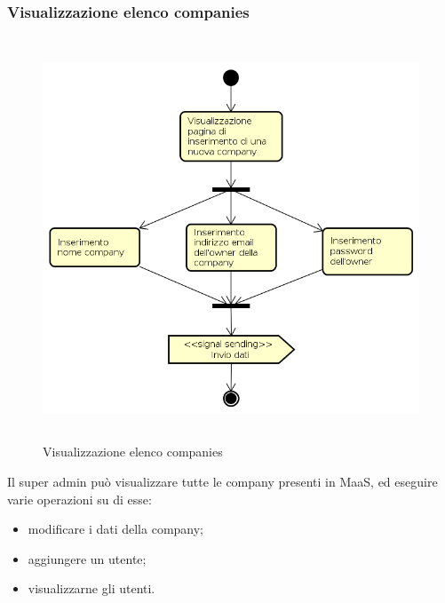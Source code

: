 \subsubsection{Visualizzazione elenco companies}
\begin{figure}[H]
\begin{center}
\includegraphics[height=12cm]{res/sections/backend/activities/creazioneCompanySA.png}
\caption{Visualizzazione elenco companies}
\end{center}
\end{figure}
Il super admin può visualizzare tutte le company presenti in MaaS, ed eseguire varie operazioni su di esse:
\begin{itemize}
\item modificare i dati della company;
\item aggiungere un utente;
\item visualizzarne gli utenti.
\end{itemize}
